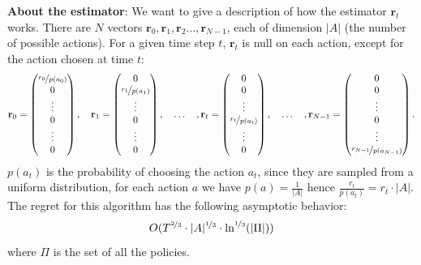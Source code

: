 \documentclass[10pt, a4paper]{report}
\begin{document}
\noindent\textbf{About the estimator}: We want to give a description of how the estimator $\mathbf r_t$ works. There are $N$ vectors $\mathbf r_0,\mathbf r_1,\mathbf r_2\dots,\mathbf r_{N-1}$, each of dimension $|A|$ (the number of possible actions). For a given time step $t$, $\mathbf r_t$ is null on each action, except for the action chosen at time $t$:\begin{equation}
    \mathbf r_0=\begin{pmatrix}
        \nicefrac{r_0}{p(a_0)}\\ 0\\ \vdots\\ 0\\ \vdots\\ 0
    \end{pmatrix},\quad
    \mathbf r_1=\begin{pmatrix}
        0\\ \nicefrac{r_1}{p(a_1)}\\ \vdots\\ 0\\ \vdots\\ 0
    \end{pmatrix},\quad\dots\quad,
    \mathbf r_t=\begin{pmatrix}
        0\\ 0\\ \vdots\\ \nicefrac{r_t}{p(a_t)}\\ \vdots\\ 0
    \end{pmatrix},\quad\dots\quad,
    \mathbf r_{N-1}=\begin{pmatrix}
        0\\ 0\\ \vdots\\ 0\\ \vdots\\ \nicefrac{r_{N-1}}{p(a_{N-1})}
    \end{pmatrix}.
\end{equation}
$p(a_t)$ is the probability of choosing the action $a_t$, since they are sampled from a uniform distribution, for each action $a$ we have $p(a)=\frac{1}{|A|}$ hence $\frac{r_t}{p(a_t)}=r_t\cdot|A|$.
The regret for this algorithm has the following asymptotic behavior:\begin{equation}
    O(T^{\nicefrac{2}{3}}\cdot|A|^{\nicefrac{1}{3}}\cdot\ln^{\nicefrac{1}{3}}(|\Pi|))
\end{equation} 
where $\Pi$ is the set of all the policies.
\end{document}

